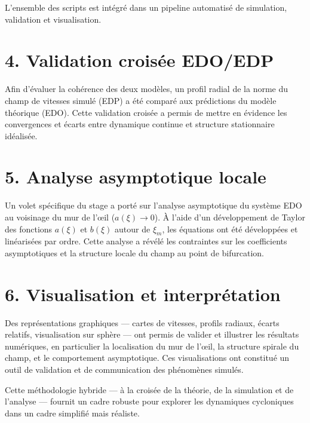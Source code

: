 L’ensemble des scripts est intégré dans un pipeline automatisé de simulation, validation et visualisation.

\section*{4. Validation croisée EDO/EDP}

Afin d’évaluer la cohérence des deux modèles, un profil radial de la norme du champ de vitesses simulé (EDP) a été comparé aux prédictions du modèle théorique (EDO). Cette validation croisée a permis de mettre en évidence les convergences et écarts entre dynamique continue et structure stationnaire idéalisée.

\section*{5. Analyse asymptotique locale}

Un volet spécifique du stage a porté sur l’analyse asymptotique du système EDO au voisinage du mur de l’œil ($a(\xi) \to 0$). À l’aide d’un développement de Taylor des fonctions $a(\xi)$ et $b(\xi)$ autour de $\xi_m$, les équations ont été développées et linéarisées par ordre. Cette analyse a révélé les contraintes sur les coefficients asymptotiques et la structure locale du champ au point de bifurcation.

\section*{6. Visualisation et interprétation}

Des représentations graphiques — cartes de vitesses, profils radiaux, écarts relatifs, visualisation sur sphère — ont permis de valider et illustrer les résultats numériques, en particulier la localisation du mur de l’œil, la structure spirale du champ, et le comportement asymptotique. Ces visualisations ont constitué un outil de validation et de communication des phénomènes simulés.

\medskip

Cette méthodologie hybride — à la croisée de la théorie, de la simulation et de l’analyse — fournit un cadre robuste pour explorer les dynamiques cycloniques dans un cadre simplifié mais réaliste.


